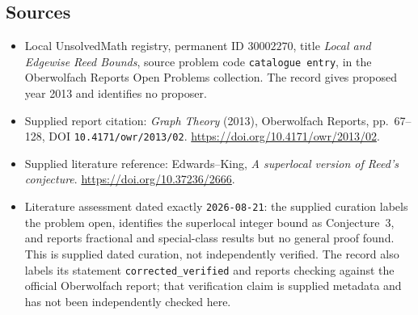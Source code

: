 \documentclass[11pt]{article}
\begin{document}
\subsection{Sources}
\begin{itemize}
\item Local UnsolvedMath registry, permanent ID \(30002270\), title \emph{Local and Edgewise Reed Bounds}, source problem code \texttt{catalogue entry}, in the Oberwolfach Reports Open Problems collection. The record gives proposed year 2013 and identifies no proposer.
\item Supplied report citation: \emph{Graph Theory} (2013), Oberwolfach Reports, pp.~67--128, DOI \texttt{10.4171/owr/2013/02}. \url{https://doi.org/10.4171/owr/2013/02}.
\item Supplied literature reference: Edwards--King, \emph{A superlocal version of Reed's conjecture}. \url{https://doi.org/10.37236/2666}.
\item Literature assessment dated exactly \texttt{2026-08-21}: the supplied curation labels the problem open, identifies the superlocal integer bound as Conjecture~3, and reports fractional and special-class results but no general proof found. This is supplied dated curation, not independently verified. The record also labels its statement \texttt{corrected\_verified} and reports checking against the official Oberwolfach report; that verification claim is supplied metadata and has not been independently checked here.
\end{itemize}
\end{document}
